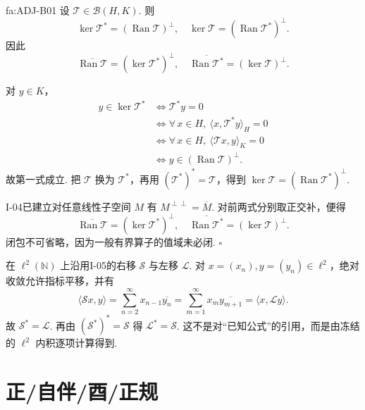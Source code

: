 \begin{FATheorem}[B][核与值域的伴随正交关系]{fa:ADJ-B01}
设 \(\displaystyle \mathcal T\in\mathcal B(H,K)\). 则
\[
\ker\mathcal T^*=(\operatorname{Ran}\mathcal T)^\perp,
\quad
\ker\mathcal T=(\operatorname{Ran}\mathcal T^*)^\perp.
\]
因此
\[
\overline{\operatorname{Ran}\mathcal T}
=(\ker\mathcal T^*)^\perp,
\quad
\overline{\operatorname{Ran}\mathcal T^*}
=(\ker\mathcal T)^\perp.
\]
\end{FATheorem}

\begin{FAProof}
对 \(\displaystyle y\in K\)，
\[
\begin{aligned}
\displaystyle y\in\ker\mathcal T^*
&\displaystyle \iff \mathcal T^*y=0\\
&\displaystyle \iff \forall\,x\in H,\ \langle x,\mathcal T^*y\rangle_H=0\\
&\displaystyle \iff \forall\,x\in H,\ \langle\mathcal T x,y\rangle_K=0\\
&\displaystyle \iff y\in(\operatorname{Ran}\mathcal T)^\perp.
\end{aligned}
\]
故第一式成立. 把 \(\displaystyle \mathcal T\) 换为 \(\displaystyle \mathcal T^*\)，再用 \(\displaystyle (\mathcal T^*)^*=\mathcal T\)，得到 \(\displaystyle \ker\mathcal T=(\operatorname{Ran}\mathcal T^*)^\perp\).

I-04已建立对任意线性子空间 \(\displaystyle M\) 有 \(\displaystyle M^{\perp\perp}=\overline M\). 对前两式分别取正交补，便得
\[
\overline{\operatorname{Ran}\mathcal T}
=(\ker\mathcal T^*)^\perp,
\quad
\overline{\operatorname{Ran}\mathcal T^*}
=(\ker\mathcal T)^\perp.
\]
闭包不可省略，因为一般有界算子的值域未必闭.
\hfill\(\square\)
\end{FAProof}

\begin{FAExample}[Hilbert伴随]\label{i11:shift-adjoint}
在 \(\displaystyle \ell^2(\mathbb N)\) 上沿用I-05的右移 \(\displaystyle \mathcal S\) 与左移 \(\displaystyle \mathcal L\). 对 \(\displaystyle x=(x_n),y=(y_n)\in\ell^2\)，绝对收敛允许指标平移，并有
\[
\langle\mathcal Sx,y\rangle =\sum_{n=2}^{\infty}x_{n-1}\overline{y_n} =\sum_{m=1}^{\infty}x_m\overline{y_{m+1}} =\langle x,\mathcal Ly\rangle.
\]
故 \(\displaystyle \mathcal S^*=\mathcal L\). 再由 \(\displaystyle (\mathcal S^*)^*=\mathcal S\) 得 \(\displaystyle \mathcal L^*=\mathcal S\). 这不是对“已知公式”的引用，而是由冻结的 \(\displaystyle \ell^2\) 内积逐项计算得到.
\end{FAExample}

\section{正/自伴/酉/正规}\label{sec:i11-hilbert-classes}

